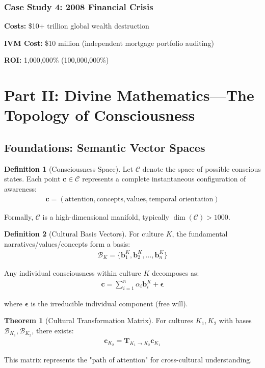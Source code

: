 \documentclass[11pt,a4paper]{article}
\theoremstyle{definition}
\newtheorem{definition}{Definition}[section]
\newtheorem{theorem}{Theorem}[section]
\theoremstyle{remark}
\newcommand{\CC}{\mathcal{C}}
\newcommand{\bb}{\mathbf{b}}
\newcommand{\cc}{\mathbf{c}}
\newcommand{\TT}{\mathbf{T}}
\begin{document}
\subsubsection{Case Study 4: 2008 Financial Crisis}

\textbf{Costs:} \$10+ trillion global wealth destruction

\textbf{IVM Cost:} \$10 million (independent mortgage portfolio auditing)

\textbf{ROI:} 1,000,000\% (100,000,000\%)

\section{Part II: Divine Mathematics—The Topology of Consciousness}

\subsection{Foundations: Semantic Vector Spaces}

\begin{definition}[Consciousness Space]
Let $\CC$ denote the space of possible conscious states. Each point $\cc \in \CC$ represents a complete instantaneous configuration of awareness:
\begin{align}
\cc = (\text{attention}, \text{concepts}, \text{values}, \text{temporal orientation})
\end{align}

Formally, $\CC$ is a high-dimensional manifold, typically $\dim(\CC) > 1000$.
\end{definition}

\begin{definition}[Cultural Basis Vectors]
For culture $K$, the fundamental narratives/values/concepts form a basis:
\begin{align}
\mathcal{B}_K = \{\bb_1^K, \bb_2^K, \ldots, \bb_n^K\}
\end{align}

Any individual consciousness within culture $K$ decomposes as:
\begin{align}
\cc = \sum_{i=1}^n \alpha_i \bb_i^K + \boldsymbol{\epsilon}
\end{align}

where $\boldsymbol{\epsilon}$ is the irreducible individual component (free will).
\end{definition}

\begin{theorem}[Cultural Transformation Matrix]
For cultures $K_1, K_2$ with bases $\mathcal{B}_{K_1}, \mathcal{B}_{K_2}$, there exists:
\begin{align}
\cc_{K_2} = \TT_{K_1 \to K_2} \cc_{K_1}
\end{align}

This matrix represents the "path of attention" for cross-cultural understanding.
\end{theorem}
\end{document}
